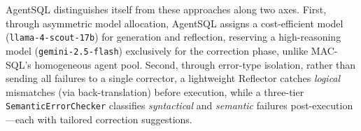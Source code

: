 AgentSQL distinguishes itself from these approaches along two axes. First, through asymmetric model allocation, AgentSQL assigns a cost-efficient model (\texttt{llama-4-scout-17b}) for generation and reflection, reserving a high-reasoning model (\texttt{gemini-2.5-flash}) exclusively for the correction phase, unlike MAC-SQL's homogeneous agent pool. Second, through error-type isolation, rather than sending all failures to a single corrector, a lightweight Reflector catches \emph{logical} mismatches (via back-translation) before execution, while a three-tier \texttt{SemanticErrorChecker} classifies \emph{syntactical} and \emph{semantic} failures post-execution---each with tailored correction suggestions.
